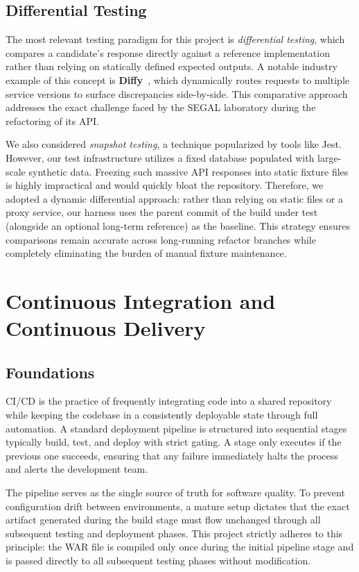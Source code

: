\subsection{Differential Testing}
\label{sec:soa-diff}

The most relevant testing paradigm for this project is \emph{differential
testing}, which compares a candidate's response directly against a reference
implementation rather than relying on statically defined expected outputs.
A notable industry example of this concept is \textbf{Diffy}~\cite{diffyTwitter},
which dynamically routes requests to multiple service versions to surface
discrepancies side-by-side. This comparative approach addresses the exact challenge
faced by the \ac{SEGAL} laboratory during the refactoring of its \ac{API}.

We also considered \emph{snapshot testing}, a technique popularized by tools
like Jest. However, our test infrastructure utilizes a fixed database populated
with large-scale synthetic data. Freezing such massive \ac{API} responses into
static fixture files is highly impractical and would quickly bloat the repository.
Therefore, we adopted a dynamic differential approach: rather than relying
on static files or a proxy service, our harness uses the parent commit of the
build under test (alongside an optional long-term reference) as the baseline.
This strategy ensures comparisons remain accurate across long-running
refactor branches while completely eliminating the burden of manual fixture
maintenance.

\section{Continuous Integration and Continuous Delivery}
\label{sec:soa-cicd}

\subsection{Foundations}

\ac{CI}/\ac{CD} is the practice of frequently integrating code into a
shared repository while keeping the codebase in a consistently deployable
state through full automation. A standard deployment pipeline is structured into
sequential stages typically build, test, and deploy with strict gating. A
stage only executes if the previous one succeeds, ensuring that any failure immediately
halts the process and alerts the development team.

The pipeline serves as the single source of truth for software quality. To
prevent configuration drift between environments, a mature setup dictates that
the exact artifact generated during the build stage must flow unchanged through
all subsequent testing and deployment phases. This project strictly adheres
to this principle: the \ac{WAR} file is compiled only once during the
initial pipeline stage and is passed directly to all subsequent testing
phases without modification.

